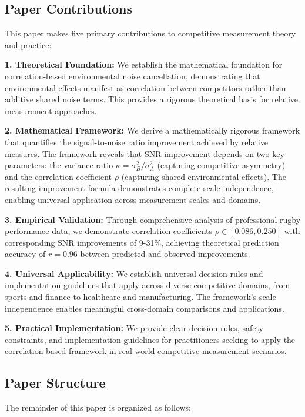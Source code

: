 \subsection{Paper Contributions}

This paper makes five primary contributions to competitive measurement theory and practice:

\textbf{1. Theoretical Foundation:}
We establish the mathematical foundation for correlation-based environmental noise cancellation, demonstrating that environmental effects manifest as correlation between competitors rather than additive shared noise terms. This provides a rigorous theoretical basis for relative measurement approaches.

\textbf{2. Mathematical Framework:}
We derive a mathematically rigorous framework that quantifies the signal-to-noise ratio improvement achieved by relative measures. The framework reveals that SNR improvement depends on two key parameters: the variance ratio $\kappa = \sigma_B^2/\sigma_A^2$ (capturing competitive asymmetry) and the correlation coefficient $\rho$ (capturing shared environmental effects). The resulting improvement formula demonstrates complete scale independence, enabling universal application across measurement scales and domains.

\textbf{3. Empirical Validation:}
Through comprehensive analysis of professional rugby performance data, we demonstrate correlation coefficients $\rho \in [0.086, 0.250]$ with corresponding SNR improvements of 9-31\%, achieving theoretical prediction accuracy of $r = 0.96$ between predicted and observed improvements.

\textbf{4. Universal Applicability:}
We establish universal decision rules and implementation guidelines that apply across diverse competitive domains, from sports and finance to healthcare and manufacturing. The framework's scale independence enables meaningful cross-domain comparisons and applications.

\textbf{5. Practical Implementation:}
We provide clear decision rules, safety constraints, and implementation guidelines for practitioners seeking to apply the correlation-based framework in real-world competitive measurement scenarios.

\subsection{Paper Structure}

The remainder of this paper is organized as follows:

